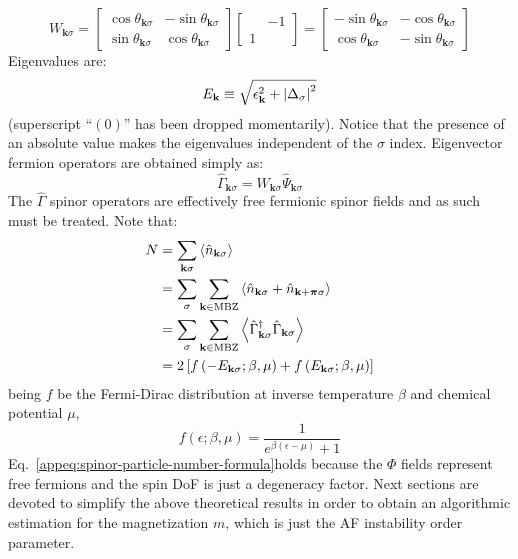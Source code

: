 \begin{equation}\label{appeq:W-explicit-form}
	W_{\mathbf{k}\sigma} = \begin{bmatrix}
		\cos \theta_{\mathbf{k}\sigma} & - \sin \theta_{\mathbf{k}\sigma} \\
		\sin \theta_{\mathbf{k}\sigma} & \cos \theta_{\mathbf{k}\sigma}
	\end{bmatrix} \begin{bmatrix}
		& -1 \\
		1 &
	\end{bmatrix} = \begin{bmatrix}
		- \sin \theta_{\mathbf{k}\sigma} & - \cos \theta_{\mathbf{k}\sigma} \\ 
		\cos \theta_{\mathbf{k}\sigma} & - \sin \theta_{\mathbf{k}\sigma}
	\end{bmatrix}
\end{equation}
Eigenvalues are:
\[
	E_\mathbf{k} \equiv \sqrt{\epsilon_{\mathbf{k}}^2 + \abs{\Delta_\sigma}^2}
\]
(superscript ``$(0)$'' has been dropped momentarily). Notice that the presence of an absolute value makes the eigenvalues independent of the $\sigma$ index. Eigenvector fermion operators are obtained simply as:
\[
	\hat\Gamma_{\mathbf{k}\sigma} = W_{\mathbf{k}\sigma} \hat \Psi_{\mathbf{k}\sigma}
\]
The $\hat\Gamma$ spinor operators are effectively free fermionic spinor fields and as such must be treated. Note that:
\begin{align}
	N &= \sum_{\mathbf{k}\sigma} \ev{\hat n_{\mathbf{k}\sigma}} \nonumber \\
	&= \sum_\sigma \sum_{\mathbf{k} \in \mathrm{MBZ}} \left\langle
		\hat n_{\mathbf{k}\sigma} + \hat n_{\mathbf{k}+\bm{\pi}\sigma}
	\right\rangle \nonumber \\
	&= \sum_\sigma \sum_{\mathbf{k} \in \mathrm{MBZ}} \left\langle
		\hat\Gamma_{\mathbf{k}\sigma}^\dagger
		\hat\Gamma_{\mathbf{k}\sigma}
	\right\rangle \nonumber \\
	&= 2 \left[
		f\left(-E_{\mathbf{k}\sigma}; \beta,\mu \right) + f \left( E_{\mathbf{k}\sigma}; \beta,\mu \right)
	\right] \label{appeq:spinor-particle-number-formula}
\end{align}
being $f$ be the Fermi-Dirac distribution at inverse temperature $\beta$ and chemical potential $\mu$,
\[
	f(\epsilon;\beta,\mu) = \frac{1}{e^{\beta(\epsilon-\mu)}+1} 
\]
Eq.~\eqref{appeq:spinor-particle-number-formula}holds because the $\Phi$ fields represent free fermions and the spin DoF is just a degeneracy factor. Next sections are devoted to simplify the above theoretical results in order to obtain an algorithmic estimation for the magnetization $m$, which is just the AF instability order parameter. 

